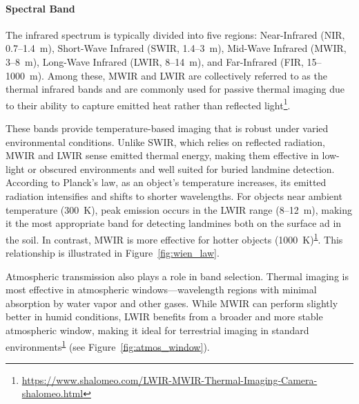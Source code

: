 \paragraph{Spectral Band}

The infrared spectrum is typically divided into five regions: Near-Infrared (NIR, 0.7–1.4~\textmu m), Short-Wave Infrared (SWIR, 1.4–3~\textmu m), Mid-Wave Infrared (MWIR, 3–8~\textmu m), Long-Wave Infrared (LWIR, 8–14~\textmu m), and Far-Infrared (FIR, 15–1000~\textmu m). Among these, MWIR and LWIR are collectively referred to as the thermal infrared bands and are commonly used for passive thermal imaging due to their ability to capture emitted heat rather than reflected light\footnote{\label{LWIR}\url{https://www.shalomeo.com/LWIR-MWIR-Thermal-Imaging-Camera-shalomeo.html}}.

These bands provide temperature-based imaging that is robust under varied environmental conditions. Unlike SWIR, which relies on reflected radiation, MWIR and LWIR sense emitted thermal energy, making them effective in low-light or obscured environments and well suited for buried landmine detection. According to Planck’s law, as an object’s temperature increases, its emitted radiation intensifies and shifts to shorter wavelengths. For objects near ambient temperature (300~K), peak emission occurs in the LWIR range (8–12~\textmu m), making it the most appropriate band for detecting landmines both on the surface ad in the soil. In contrast, MWIR is more effective for hotter objects (1000~K)\textsuperscript{\ref{LWIR}}. This relationship is illustrated in Figure~\ref{fig:wien_law}.

Atmospheric transmission also plays a role in band selection. Thermal imaging is most effective in atmospheric windows—wavelength regions with minimal absorption by water vapor and other gases. While MWIR can perform slightly better in humid conditions, LWIR benefits from a broader and more stable atmospheric window, making it ideal for terrestrial imaging in standard environments\textsuperscript{\ref{LWIR}} (see Figure~\ref{fig:atmos_window}).

